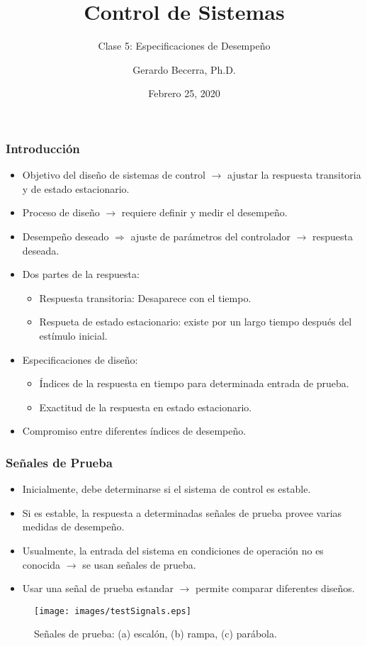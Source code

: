 \documentclass[aspectratio=169,handout]{beamer}
\title{Control de Sistemas}
\subtitle{\small Clase 5: Especificaciones de Desempeño}
\author{Gerardo Becerra, Ph.D.}
\institute{Pontificia Universidad Javeriana\\ Departamento de Electrónica}
\date{Febrero 25, 2020}
\theoremstyle{definition}
\theoremstyle{plain}
\theoremstyle{remark}
\begin{document}
\frame{\titlepage}	


\begin{frame}[<+->]\frametitle{Introducción}
\begin{itemize}
	\item Objetivo del diseño de sistemas de control $\rightarrow$ ajustar la respuesta transitoria y de estado estacionario.
	\item Proceso de diseño $\rightarrow$ requiere definir y medir el desempeño.
	\item Desempeño deseado $\Rightarrow$ ajuste de parámetros del controlador $\rightarrow$ respuesta deseada.
	\item Dos partes de la respuesta:
	\begin{itemize}
		\item Respuesta transitoria: Desaparece con el tiempo.
		\item Respueta de estado estacionario: existe por un largo tiempo después del estímulo inicial.
	\end{itemize}
	\item Especificaciones de diseño:
	\begin{itemize}
		\item Índices de la respuesta en tiempo para determinada entrada de prueba.
		\item Exactitud de la respuesta en estado estacionario.
	\end{itemize}
	\item Compromiso entre diferentes índices de desempeño.
\end{itemize}
\end{frame}

\begin{frame}[<+->]\frametitle{Señales de Prueba}
	\begin{itemize}
		\item Inicialmente, debe determinarse si el sistema de control es estable.
		\item Si es estable, la respuesta a determinadas señales de prueba provee varias medidas de desempeño.
		\item Usualmente, la entrada del sistema en condiciones de operación no es conocida $\rightarrow$ se usan señales de prueba.
		\item Usar una señal de prueba estandar $\rightarrow$ permite comparar diferentes diseños.
	\end{itemize}
	\begin{figure}
		\texttt{[image: images/testSignals.eps]}
		\caption{Señales de prueba: (a) escalón, (b) rampa, (c) parábola.}
	\end{figure}
\end{frame}
\end{document}
